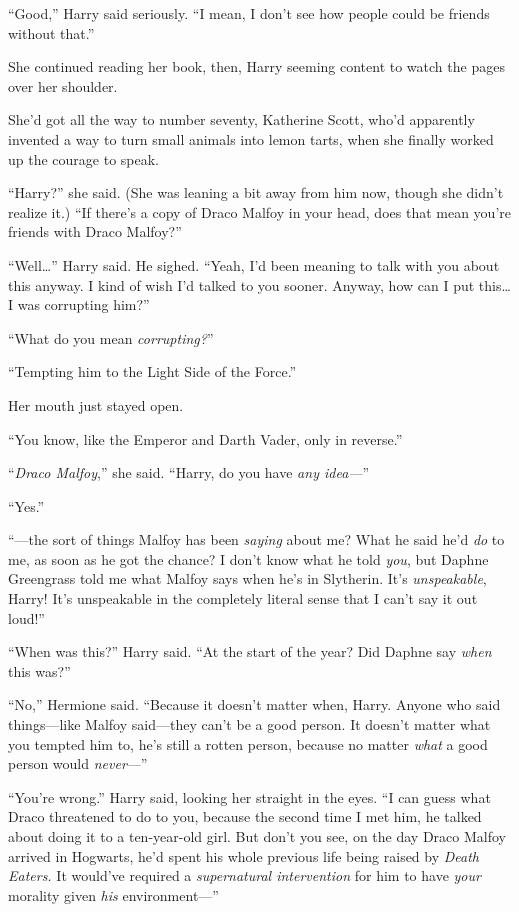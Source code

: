 “Good,” Harry said seriously. “I mean, I don’t see how people could be friends without that.”

She continued reading her book, then, Harry seeming content to watch the pages over her shoulder.

She’d got all the way to number seventy, Katherine Scott, who’d apparently invented a way to turn small animals into lemon tarts, when she finally worked up the courage to speak.

“Harry?” she said. (She was leaning a bit away from him now, though she didn’t realize it.) “If there’s a copy of Draco Malfoy in your head, does that mean you’re friends with Draco Malfoy?”

“Well…” Harry said. He sighed. “Yeah, I’d been meaning to talk with you about this anyway. I kind of wish I’d talked to you sooner. Anyway, how can I put this…I was corrupting him?”

“What do you mean \emph{corrupting?}”

“Tempting him to the Light Side of the Force.”

Her mouth just stayed open.

“You know, like the Emperor and Darth Vader, only in reverse.”

“\emph{Draco Malfoy},” she said. “Harry, do you have \emph{any idea—}”

“Yes.”

“—the sort of things Malfoy has been \emph{saying} about me? What he said he’d \emph{do} to me, as soon as he got the chance? I don’t know what he told \emph{you}, but Daphne Greengrass told me what Malfoy says when he’s in Slytherin. It’s \emph{unspeakable}, Harry! It’s unspeakable in the completely literal sense that I can’t say it out loud!”

“When was this?” Harry said. “At the start of the year? Did Daphne say \emph{when} this was?”

“No,” Hermione said. “Because it doesn’t matter when, Harry. Anyone who said things—like Malfoy said—they can’t be a good person. It doesn’t matter what you tempted him to, he’s still a rotten person, because no matter \emph{what} a good person would \emph{never}—”

“You’re wrong.” Harry said, looking her straight in the eyes. “I can guess what Draco threatened to do to you, because the second time I met him, he talked about doing it to a ten-year-old girl. But don’t you see, on the day Draco Malfoy arrived in Hogwarts, he’d spent his whole previous life being raised by \emph{Death Eaters.} It would’ve required a \emph{supernatural intervention} for him to have \emph{your} morality given \emph{his} environment—”

